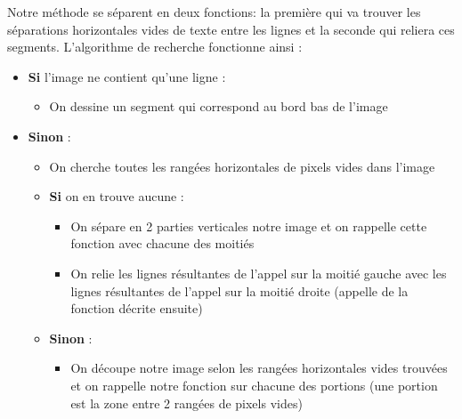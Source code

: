 \documentclass[12pt,a4paper]{article}
\begin{document}
Notre méthode se séparent en deux fonctions: la première qui va trouver les séparations horizontales vides de texte entre les lignes et la seconde qui reliera ces segments.\bigbreak
L’algorithme de recherche fonctionne ainsi :
\bigbreak
\begin{itemize}
    \item \textbf{Si} l’image ne contient qu’une ligne :
        \begin{itemize}
            \item On dessine un segment qui correspond au bord bas de l’image
        \end{itemize}
    \item \textbf{Sinon} :
        \begin{itemize}
            \item On cherche toutes les rangées horizontales de pixels vides dans l’image
            \item \textbf{Si} on en trouve aucune :
            \begin{itemize}
                \item On sépare en 2 parties verticales notre image et on rappelle cette fonction avec chacune des moitiés
                \item On relie les lignes résultantes de l’appel sur la moitié gauche avec les lignes résultantes de l’appel sur la moitié droite (appelle de la fonction décrite ensuite)
            \end{itemize}
        \item \textbf{Sinon} :
        \begin{itemize}
            \item On découpe notre image selon les rangées horizontales vides trouvées et on rappelle notre fonction sur chacune des portions (une portion est la zone entre 2 rangées de pixels vides)
        \end{itemize}
    \end{itemize}
\end{itemize}
\end{document}
